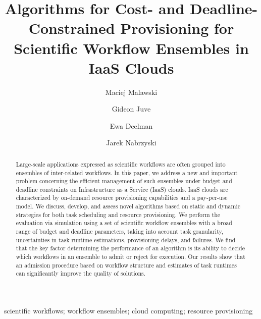 \documentclass[preprint,5p]{elsarticle}
\begin{document}
\begin{frontmatter}

\title{Algorithms for Cost- and Deadline-Constrained Provisioning for Scientific Workflow
Ensembles in IaaS Clouds}

\author[agh]{Maciej Malawski}
\author[isi]{Gideon Juve}
\author[isi]{Ewa Deelman}
\author[nd]{Jarek Nabrzyski}

\address[agh]{AGH University of Science and Technology, Dept. of Computer Science, Al. Mickiewicza 30, Krakow, Poland} 
\address[isi]{USC Information Sciences Institute, 4676 Admiralty Way, Marina del Rey, CA, USA} 
\address[nd]{University of Notre Dame, Center for Research Computing, 111 ITC, Notre Dame, IN, USA}

\begin{abstract}

Large-scale applications expressed as scientific workflows are often grouped
into ensembles of inter-related workflows. In this paper, we address a new and
important problem concerning the efficient management of such ensembles under
budget and deadline constraints on Infrastructure as a Service (IaaS) clouds.
IaaS clouds are characterized by on-demand resource provisioning capabilities
and a pay-per-use model. We discuss, develop, and assess novel algorithms based on
static and dynamic strategies for both task scheduling and resource
provisioning. We perform the evaluation via simulation using a set of scientific
workflow ensembles with a broad range of budget and deadline parameters, taking
into account task granularity, uncertainties in task runtime estimations,
provisioning delays, and failures. We find that the key factor determining the
performance of an algorithm is its ability to decide which workflows in an
ensemble to admit or reject for execution. Our results show that an admission
procedure based on workflow structure and estimates of task runtimes can
significantly improve the quality of solutions.

\end{abstract}

\begin{keyword}
scientific workflows; workflow ensembles; cloud computing; resource provisioning
\end{keyword}

\end{frontmatter}
\end{document}
